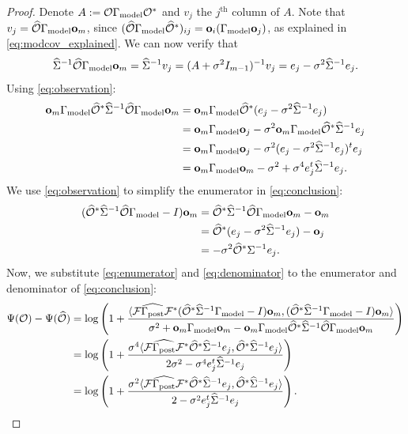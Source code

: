 \documentclass[ba]{imsart}
\newcommand{\obs}{\mathcal{O}}
\newcommand{\fwd}{\mathcal{F}}
\newcommand{\obsm}{\widehat{\obs}}
\newcommand{\Sigmam}{\widehat{\Sigma}}
\newcommand{\postcovm}{\widehat{\Gamma_{\textup{post}}}}
\newcommand{\tar}{\Psi}
\newcommand{\meas}{\mathbf{o}}
\theoremstyle{plain}
\theoremstyle{definition}
\theoremstyle{remark}
\begin{document}
\begin{proof} \label{cor:same_meas_proof}
  Denote $A:= \obs \modcov \obs^*$ and $v_j$ the $j^{\text{th}}$
  column of $A$.  Note that $v_j = \obsm \modcov \meas_m$, since
  $(\obsm \modcov \obsm^*)_{ij} = \meas_i(\modcov \meas_j)$, as
  explained in \eqref{eq:modcov_explained}. We can now verify that
  \begin{equation}\label{eq:observation}
    \Sigmam^{-1} \obsm \modcov \meas_m = \Sigmam^{-1}v_j = (A +\sigma^2I_{m-1})^{-1} v_j =
    e_j -\sigma^2 \Sigmam^{-1}e_j.
  \end{equation}
Using \eqref{eq:observation}:
  \begin{align}\label{eq:denominator}
    \begin{split}
      \meas_m \modcov \obsm^* \Sigmam^{-1} \obsm \modcov \meas_m
      &= \meas_m \modcov \obsm^* ( e_j - \sigma^2 \Sigmam^{-1} e_j )\\
&= \meas_m \modcov \meas_j - \sigma^2 \meas_m \modcov \obsm^* \Sigmam^{-1}e_j \\
&= \meas_m \modcov \meas_j -\sigma^2 (e_j - \sigma^2 \Sigmam^{-1}e_j)^t e_j \\
&= \meas_m \modcov \meas_m -\sigma^2 + \sigma^4 e_j^t\Sigmam^{-1}e_j.
    \end{split}
  \end{align}
  We use \eqref{eq:observation} to simplify the enumerator in
  \eqref{eq:conclusion}:
  \begin{align}\label{eq:enumerator}
    \begin{split}
      (\obsm^* \Sigmam^{-1} \obsm \modcov - I ) \meas_m
      &= \obsm^* \Sigmam^{-1} \obsm \modcov \meas_m - \meas_m \\
&= \obsm^* (e_j - \sigma^2 \Sigmam^{-1} e_j) -\meas_j \\ 
&= -\sigma^2 \obsm^* \Sigma^{-1}e_j. 
    \end{split}
  \end{align}
Now, we substitute \eqref{eq:enumerator} and \eqref{eq:denominator}
  to the enumerator and denominator of \eqref{eq:conclusion}:
\begin{align*}
    \tar( \obs ) - \tar (\obsm ) &=
    \log \left ( 1 + \frac{
      \langle \fwd \postcovm \fwd^* (\obsm^* \Sigmam^{-1} \modcov - I ) \meas_m,
      (\obsm^* \Sigmam^{-1} \modcov - I ) \meas_m \rangle
    }{
      \sigma^2 + \meas_m \modcov \meas_m - \meas_m \modcov \obsm^* \Sigmam^{-1} \obsm \modcov \meas_m 
    }       
    \right ) \\
&= \log \left ( 1 + \frac{\sigma^4
      \langle \fwd \postcovm \fwd^* \obsm^* \Sigmam^{-1} e_j,
      \obsm^* \Sigmam^{-1}e_j \rangle
    }{
      2\sigma^2 - \sigma^4 e_j^t\Sigmam^{-1}e_j 
    }       
    \right ) \\
&= \log \left ( 1 + \frac{\sigma^2
      \langle \fwd \postcovm \fwd^* \obsm^* \Sigmam^{-1} e_j,
      \obsm^* \Sigmam^{-1}e_j \rangle
    }{
      2 - \sigma^2 e_j^t\Sigmam^{-1}e_j 
    }       
    \right ).
  \end{align*}
\end{proof}
\end{document}
